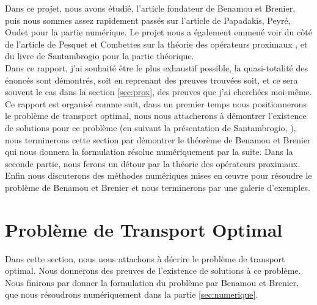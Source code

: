 \documentclass[a4paper,12pt]{article}
\begin{document}
\vspace{-0.3cm}

Dans ce projet, nous avons étudié, l'article fondateur de Benamou et Brenier, puis nous sommes assez rapidement passés sur l'article de Papadakis, Peyré, Oudet \cite{papadakis} pour la partie numérique. Le projet nous a également emmené voir du côté de l'article de Pesquet et Combettes sur la théorie des opérateurs proximaux \cite{combettes}, et du livre de Santambrogio \cite{santambrogio2015optimal} pour la partie théorique.\\ 

Dans ce rapport, j'ai souhaité être le plus exhaustif possible, la quasi-totalité des énoncés sont démontrés, soit en reprenant des preuves trouvées soit, et ce sera souvent le cas dans la section \eqref{sec:prox}, des preuves que j'ai cherchées moi-même. Ce rapport est organisé comme suit, dans un premier temps nous positionnerons le problème de transport optimal, nous nous attacherons à démontrer l'existence de solutions pour ce problème (en suivant la présentation de Santambrogio, \cite{santambrogio2015optimal}), nous terminerons cette section par démontrer le théorème de Benamou et Brenier qui nous donnera la formulation résolue numériquement par la suite. Dans la seconde partie, nous ferons un détour par la théorie des opérateurs proximaux. Enfin nous discuterons des méthodes numériques mises en œuvre pour résoudre le problème de Benamou et Brenier et nous terminerons par une galerie d'exemples. 

\newpage


\section{Problème de Transport Optimal}
Dans cette section, nous nous attachons à décrire le problème de transport optimal. Nous donnerons des preuves de l'existence de solutions à ce problème. Nous finirons par donner la formulation du problème par Benamou et Brenier, que nous résoudrons numériquement dans la partie \ref{sec:numerique}. 
\end{document}

